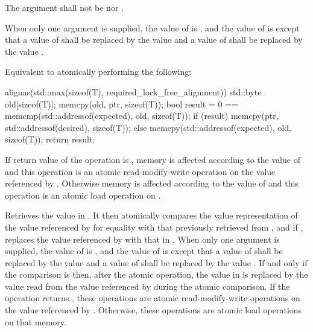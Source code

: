 \begin{itemdescr}
\pnum
\removed{\requires}\added{\expects} The  argument shall not be
 nor .

\pnum
\effects
\begin{addedblock}
When only one  argument is supplied,
the value of  is , and
the value of  is 
except that a value of  shall be replaced by
the value  and
a value of  shall be replaced by
the value .
\end{addedblock}

\begin{addedblock}
Equivalent to atomically performing the following:
\begin{codeblock}
  alignas(std::max(sizeof(T), required_lock_free_alignment)) std::byte old[sizeof(T)];
  memcpy(old, ptr, sizeof(T));
  bool result = 0 == memcmp(std::addressof(expected), old, sizeof(T));
  if (result) memcpy(ptr, std::addressof(desired), sizeof(T));
  else memcpy(std::addressof(expected), old, sizeof(T));
  return result;
\end{codeblock}

\pnum
If return value of the operation is ,
memory is affected according to the value of  and
this operation is an atomic read-modify-write operation on
the value referenced by .
Otherwise memory is affected according to the value of  and
this operation is an atomic load operation on .
\end{addedblock}

\begin{removedblock}
Retrieves the value in .
It then atomically compares the value representation of
the value referenced by  for equality
with that previously retrieved from ,
and if , replaces the value referenced by 
with that in .
When only one  argument is supplied,
the value of  is , and
the value of  is 
except that a value of  shall be replaced by
the value  and
a value of  shall be replaced by
the value .
If and only if the comparison is  then,
after the atomic operation,
the value in  is replaced by
the value read from the value referenced by 
during the atomic comparison.
If the operation returns ,
these operations are atomic read-modify-write operations
on the value referenced by .
Otherwise, these operations are atomic load operations on that memory.
\end{removedblock}


\end{itemdescr}
